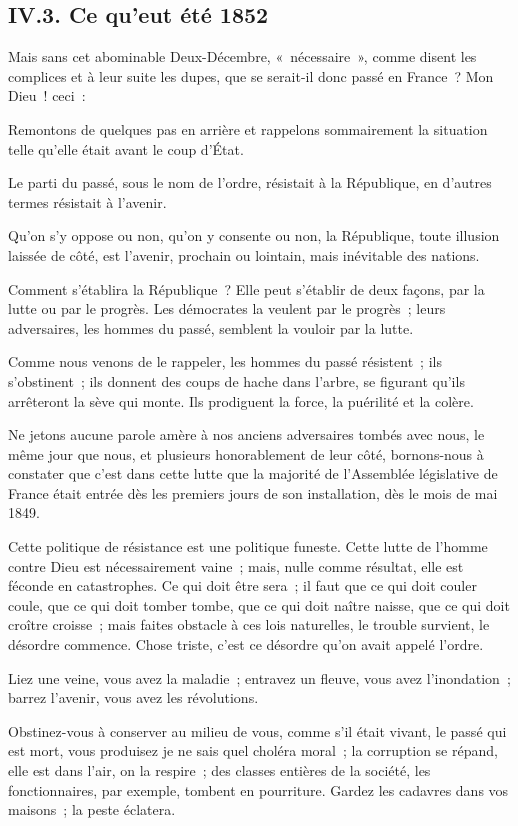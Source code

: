 \documentclass[french,twoside]{book} %
\begin{document}
\subsection[{IV.3. Ce qu’eut été 1852}]{IV.3. Ce qu’eut été 1852}
\noindent Mais sans cet abominable Deux-Décembre, « nécessaire », comme disent les complices et à leur suite les dupes, que se serait-il donc passé en France ? Mon Dieu ! ceci :\par
Remontons de quelques pas en arrière et rappelons sommairement la situation telle qu’elle était avant le coup d’État.\par
Le parti du passé, sous le nom de l’ordre, résistait à la République, en d’autres termes résistait à l’avenir.\par
Qu’on s’y oppose ou non, qu’on y consente ou non, la République, toute illusion laissée de côté, est l’avenir, prochain ou lointain, mais inévitable des nations.\par
Comment s’établira la République ? Elle peut s’établir de deux façons, par la lutte ou par le progrès. Les démocrates la veulent par le progrès ; leurs adversaires, les hommes du passé, semblent la vouloir par la lutte.\par
Comme nous venons de le rappeler, les hommes du passé résistent ; ils s’obstinent ; ils donnent des coups de hache dans l’arbre, se figurant qu’ils arrêteront la sève qui monte. Ils prodiguent la force, la puérilité et la colère.\par
Ne jetons aucune parole amère à nos anciens adversaires tombés avec nous, le même jour que nous, et plusieurs honorablement de leur côté, bornons-nous à constater que c’est dans cette lutte que la majorité de l’Assemblée législative de France était entrée dès les premiers jours de son installation, dès le mois de mai 1849.\par
Cette politique de résistance est une politique funeste. Cette lutte de l’homme contre Dieu est nécessairement vaine ; mais, nulle comme résultat, elle est féconde en catastrophes. Ce qui doit être sera ; il faut que ce qui doit couler coule, que ce qui doit tomber tombe, que ce qui doit naître naisse, que ce qui doit croître croisse ; mais faites obstacle à ces lois naturelles, le trouble survient, le désordre commence. Chose triste, c’est ce désordre qu’on avait appelé l’ordre.\par
Liez une veine, vous avez la maladie ; entravez un fleuve, vous avez l’inondation ; barrez l’avenir, vous avez les révolutions.\par
Obstinez-vous à conserver au milieu de vous, comme s’il était vivant, le passé qui est mort, vous produisez je ne sais quel choléra moral ; la corruption se répand, elle est dans l’air, on la respire ; des classes entières de la société, les fonctionnaires, par exemple, tombent en pourriture. Gardez les cadavres dans vos maisons ; la peste éclatera.\par
\end{document}
